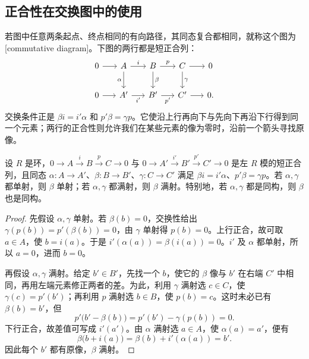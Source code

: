 \subsection{正合性在交换图中的使用}
\label{b2:subsec:0303:03}

若图中任意两条起点、终点相同的有向路径，其同态复合都相同，就称这个图为[commutative diagram]。下图的两行都是短正合列：
\begin{equation}\label{b2:eq:short-exact-diagram}
	\begin{tikzcd}[column sep=1.6em,row sep=2em]
		0\arrow[r]&A\arrow[r,"i"]\arrow[d,"\alpha"']&B\arrow[r,"p"]\arrow[d,"\beta"]&C\arrow[r]\arrow[d,"\gamma"]&0\\
		0\arrow[r]&A'\arrow[r,"i'"']&B'\arrow[r,"p'"']&C'\arrow[r]&0.
	\end{tikzcd}
\end{equation}
交换条件正是 \(\beta i=i'\alpha\) 和 \(p'\beta=\gamma p\)。它使沿上行再向下与先向下再沿下行得到同一个元素；两行的正合性则允许我们在某些元素的像为零时，沿前一个箭头寻找原像。

\begin{lemma}[短五引理]\label{b2:lem:short-five}
	设 \(R\) 是环，\(0\to A\xrightarrow{i}B\xrightarrow{p}C\to0\) 与 \(0\to A'\xrightarrow{i'}B'\xrightarrow{p'}C'\to0\) 是左 \(R\) 模的短正合列，且同态 \(\alpha:A\to A'\)、\(\beta:B\to B'\)、\(\gamma:C\to C'\) 满足 \(\beta i=i'\alpha\)、\(p'\beta=\gamma p\)。若 \(\alpha,\gamma\) 都单射，则 \(\beta\) 单射；若 \(\alpha,\gamma\) 都满射，则 \(\beta\) 满射。特别地，若 \(\alpha,\gamma\) 都是同构，则 \(\beta\) 也是同构。
\end{lemma}

\begin{proof}
	先假设 \(\alpha,\gamma\) 单射。若 \(\beta(b)=0\)，交换性给出 \(\gamma(p(b))=p'(\beta(b))=0\)，由 \(\gamma\) 单射得 \(p(b)=0\)。上行正合，故可取 \(a\in A\)，使 \(b=i(a)\)。于是 \(i'(\alpha(a))=\beta(i(a))=0\)。\(i'\) 及 \(\alpha\) 都单射，所以 \(a=0\)，进而 \(b=0\)。

	再假设 \(\alpha,\gamma\) 满射。给定 \(b'\in B'\)，先找一个 \(b\)，使它的 \(\beta\) 像与 \(b'\) 在右端 \(C'\) 中相同，再用左端元素修正两者的差。为此，利用 \(\gamma\) 满射选 \(c\in C\)，使 \(\gamma(c)=p'(b')\)；再利用 \(p\) 满射选 \(b\in B\)，使 \(p(b)=c\)。这时未必已有 \(\beta(b)=b'\)，但
	\[
		p'\bigl(b'-\beta(b)\bigr)=p'(b')-\gamma(p(b))=0.
	\]
	下行正合，故差值可写成 \(i'(a')\)。由 \(\alpha\) 满射选 \(a\in A\)，使 \(\alpha(a)=a'\)，便有
	\[
		\beta\bigl(b+i(a)\bigr)=\beta(b)+i'(\alpha(a))=b'.
	\]
	因此每个 \(b'\) 都有原像，\(\beta\) 满射。
\end{proof}

